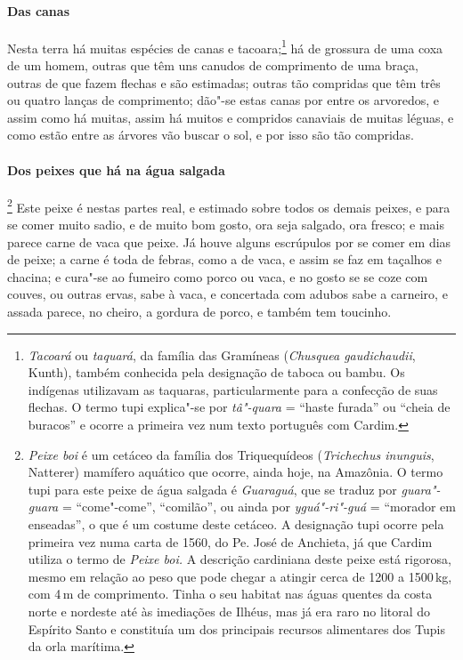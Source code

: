 \begin{linenumbers}
\paragraph{Das canas}\quad
Nesta terra há muitas espécies de canas e tacoara;\footnote{ \textit{Tacoará} 
ou \textit{taquará}, da família das Gramíneas
(\textit{Chusquea gaudichaudii}, Kunth), também conhecida pela
designação de taboca ou bambu. Os indígenas utilizavam as taquaras,
particularmente para a confecção de suas flechas. O termo tupi
explica"-se por \textit{tâ"-quara} = ``haste furada'' ou ``cheia de buracos''
e ocorre a primeira vez num texto português com Cardim.} há de grossura
de uma coxa de um homem, outras que têm uns canudos de comprimento de
uma braça, outras de que fazem flechas e são estimadas; outras tão
compridas que têm três ou quatro lanças de comprimento; dão"-se estas
canas por entre os arvoredos, e assim como há muitas, assim há muitos e
compridos canaviais de muitas léguas, e como estão entre as árvores vão
buscar o sol, e por isso são tão compridas.

\paragraph{Dos peixes que há na água salgada}\quad
{}\footnote{ \textit{Peixe boi} é um cetáceo da
família dos Triquequídeos (\textit{Trichechus inunguis}, Natterer)
mamífero aquático que ocorre, ainda hoje, na Amazônia. O termo tupi
para este peixe de água salgada é \textit{Guaraguá}, que se
traduz por \textit{guara"-guara} = ``come"-come'', ``comilão'', ou ainda
por \textit{yguá"-ri"-guá} = ``morador em enseadas'', o que é um costume
deste cetáceo. A designação tupi ocorre pela primeira vez numa carta 
de 1560, do Pe. José de Anchieta, já que Cardim utiliza o termo
de \textit{Peixe boi.} A descrição cardiniana deste peixe está
rigorosa, mesmo em relação ao peso que pode chegar a atingir cerca de
1200 a 1500\,kg, com 4\,m de comprimento. Tinha o seu habitat nas águas
quentes da costa norte e nordeste até às imediações de Ilhéus, mas já
era raro no litoral do Espírito Santo e constituía um dos principais
recursos alimentares dos Tupis da orla marítima.} Este
peixe é nestas partes real, e estimado sobre todos os demais peixes, e
para se comer muito sadio, e de muito bom gosto, ora seja salgado, ora
fresco; e mais parece carne de vaca que peixe. Já houve alguns
escrúpulos por se comer em dias de peixe; a carne é toda de febras,
como a de vaca, e assim se faz em taçalhos e chacina; e cura"-se ao
fumeiro como porco ou vaca, e no gosto se se coze com couves, ou outras
ervas, sabe à vaca, e concertada com adubos sabe a carneiro, e assada
parece, no cheiro, a gordura de porco, e também tem toucinho.


\end{linenumbers}
